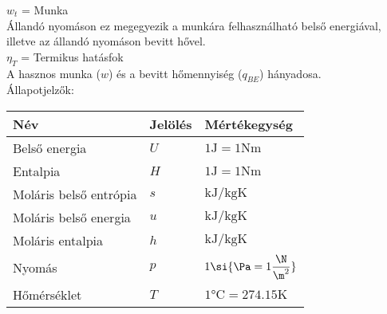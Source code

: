 $w_t$ =  Munka\\
Állandó nyomáson ez megegyezik a munkára felhasználható belső
energiával, illetve az állandó nyomáson bevitt hővel.\\
$\eta_T$ =  Termikus hatásfok\\
A hasznos munka ($w$) és a bevitt hőmennyiség ($q_{BE}$) hányadosa.\\
Állapotjelzők:\\
\begin{tabular}{ | p{4cm} | p{3cm} | p{3cm} | } 
	\hline
\centering	Név &\centering Jelölés & Mértékegység \\ 
	\hline

\centering	Belső energia &\centering $U$ & $1\si{\joule=1\N\meter}$ \\ 
	\hline
\centering	Entalpia &\centering $H$ & $1\si{\joule=1\N\meter}$ \\ 
	\hline
\centering	Moláris belső entrópia &\centering $s$ & $\si{\kilo\joule\per\kilogram\kelvin}$ \\ 
	\hline
\centering	Moláris belső energia &\centering $u$ & $\si{\kilo\joule\per\kilogram\kelvin}$ \\ 
	\hline
\centering	Moláris entalpia &\centering $h$ & $\si{\kilo\joule\per\kilogram\kelvin}$ \\ 
	\hline
\centering	Nyomás &\centering $p$ & $1\si{\Pa=1\dfrac{\N}{\m^2}}$ \\ 
	\hline
\centering	Hőmérséklet &\centering $T$ & $1\si{\celsius={274.15}\kelvin}$ \\ 
	\hline
\end{tabular}
\pagebreak